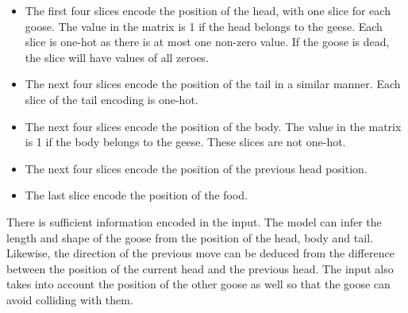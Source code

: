 \begin{itemize}
    \item The first four slices encode the position of the head, with one slice for each goose. The value in the matrix is 1 if the head belongs to the geese. Each slice is one-hot as there is at most one non-zero value. If the goose is dead, the slice will have values of all zeroes.
    \item The next four slices encode the position of the tail in a similar manner. Each slice of the tail encoding is one-hot.
    \item The next four slices encode the position of the body. The value in the matrix is 1 if the body belongs to the geese. These slices are not one-hot.
    \item The next four slices encode the position of the previous head position.
    \item The last slice encode the position of the food. 
\end{itemize}




There is sufficient information encoded in the input. The model can infer the length and shape of the goose from the position of the head, body and tail. Likewise, the direction of the previous move can be deduced from the difference between the position of the current head and the previous head. The input also takes into account the position of the other goose as well so that the goose can avoid colliding with them.


